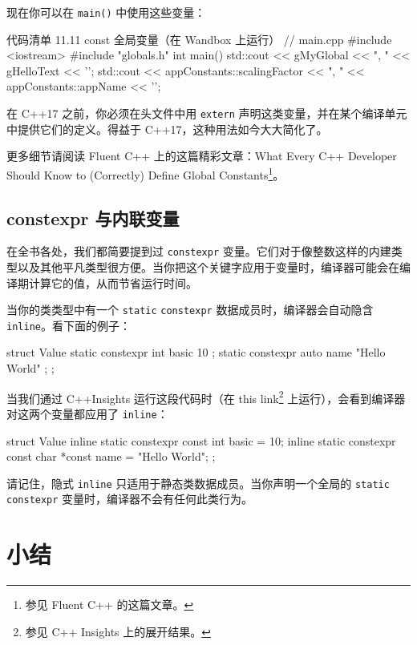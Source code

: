 现在你可以在 \texttt{main()} 中使用这些变量：

\begin{codeboxt}[cpp]{代码清单 11.11 const 全局变量（在 Wandbox 上运行）}
// main.cpp
#include <iostream>
#include "globals.h"
int main() {
std::cout << gMyGlobal << ", " << gHelloText << '\n';
std::cout << appConstants::scalingFactor << ", "
<< appConstants::appName << '\n';
}
\end{codeboxt}


在 C++17 之前，你必须在头文件中用 \texttt{extern} 声明这类变量，并在某个编译单元中提供它们的定义。得益于 C++17，这种用法如今大大简化了。

更多细节请阅读 Fluent C++ 上的这篇精彩文章：What Every C++ Developer Should Know to (Correctly) Define Global Constants\footnote{参见 Fluent C++ 的这篇文章。}。

\subsection{constexpr 与内联变量}

在全书各处，我们都简要提到过 \texttt{constexpr} 变量。它们对于像整数这样的内建类型以及其他平凡类型很方便。当你把这个关键字应用于变量时，编译器可能会在编译期计算它的值，从而节省运行时间。

当你的类类型中有一个 \texttt{static} \texttt{constexpr} 数据成员时，编译器会自动隐含 \texttt{inline}。看下面的例子：

\begin{codebox}[cpp]
struct Value {
static constexpr int basic { 10 };
static constexpr auto name { "Hello World" };
};
\end{codebox}

当我们通过 C++Insights 运行这段代码时（在 this link\footnote{参见 C++ Insights 上的展开结果。} 上运行），会看到编译器对这两个变量都应用了 \texttt{inline}：

\begin{codebox}[cpp]
struct Value {
inline static constexpr const int basic = {10};
inline static constexpr const char *const name = {"Hello World"};
};
\end{codebox}

请记住，隐式 \texttt{inline} 只适用于静态类数据成员。当你声明一个全局的 \texttt{static constexpr} 变量时，编译器不会有任何此类行为。

\section{小结}

